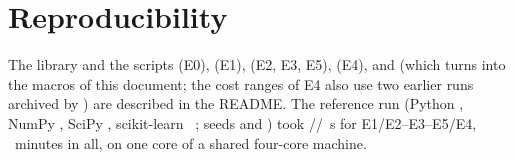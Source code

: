\documentclass[10pt,a4paper]{article}
\theoremstyle{plain}
\theoremstyle{definition}
\theoremstyle{remark}
\begin{document}
\appendix
\section{Reproducibility}\label{app:repro}
{\sloppy The library  and the scripts  (E0),  (E1),  (E2, E3, E5),  (E4),  and  (which turns  into the macros of this document; the cost ranges of E4 also use two earlier runs archived by ) are described in the README. The reference run (Python \MetaPython, NumPy \MetaNumpy, SciPy \MetaScipy, scikit-learn \MetaSklearn~\citep{pedregosa2011}; seeds \MetaSeed{} and \MetaSeedScaling) took \MetaSecondsValidation/\MetaSecondsFragility/\MetaSecondsScaling~s for E1/E2--E3--E5/E4, \MetaMinutesTotal~minutes in all, on one core of a shared four-core machine.\par}
\end{document}
